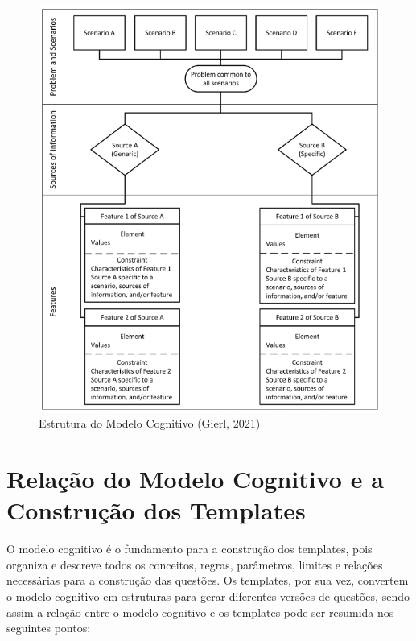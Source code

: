 \begin{figure}[ht]
	\centering
	\includegraphics[width=12cm]{./imagens/capitulo4/cognitive-model}
	\caption{Estrutura do Modelo Cognitivo (Gierl, 2021)}
	\label{fig:cognitive-model}
\end{figure}


\section{Relação do Modelo Cognitivo e a Construção dos Templates }

O modelo cognitivo é o fundamento para a construção dos templates, pois organiza e descreve todos os conceitos, regras, parâmetros, limites e relações necessárias para a construção das questões. Os templates, por sua vez, convertem o modelo cognitivo em estruturas para gerar diferentes versões de questões, sendo assim a relação entre o modelo cognitivo e os templates pode ser resumida nos seguintes pontos:


